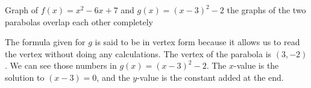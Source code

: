 \documentclass{ximera}
\begin{document}
       Graph of $f(x)=x^2-6x+7$ and $g(x)=(x-3)^2-2$
       the graphs of the two parabolas overlap each other completely
\begin{image}
     \end{image}



      The formula given for $g$ is said to be in vertex form
      because it allows us to read the vertex without doing any calculations.
      The vertex of the parabola is $(3,-2)$.
      We can see those numbers in $g(x)=(x-3)^2-2$.
      The $x$-value is the solution to $(x-3)=0$,
      and the $y$-value is the constant
      added at the end.
\end{document}
